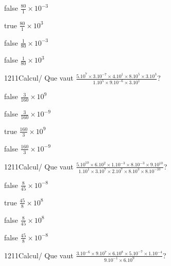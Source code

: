 \documentclass[11pt]{article}
\begin{document}
            \begin{reponses}
                \item[false] $\frac{80}{1}\times 10^{-3}$
                \item[true] $\frac{80}{1}\times 10^{3}$
                \item[false] $\frac{1}{80}\times 10^{-3}$
                \item[false] $\frac{1}{80}\times 10^{3}$
            \end{reponses}
            
            \begin{question}{1211}{Calcul}{}{/}
                Que vaut $\frac{5.10^{7}\times 3.10^{-7}\times 4.10^{1}\times 8.10^{5}\times 3.10^{3}}{1.10^{5}\times 9.10^{-6}\times 3.10^{1}}$?
            \end{question}
            
            \begin{reponses}
                \item[false] $\frac{3}{160}\times 10^{9}$
                \item[false] $\frac{3}{160}\times 10^{-9}$
                \item[true] $\frac{160}{3}\times 10^{9}$
                \item[false] $\frac{160}{3}\times 10^{-9}$
            \end{reponses}
            
            \begin{question}{1211}{Calcul}{}{/}
                Que vaut $\frac{5.10^{10}\times 6.10^{2}\times 1.10^{-3}\times 8.10^{-3}\times 9.10^{10}}{1.10^{1}\times 3.10^{7}\times 2.10^{7}\times 8.10^{3}\times 8.10^{-10}}$?
            \end{question}
            
            \begin{reponses}
                \item[false] $\frac{8}{45}\times 10^{-8}$
                \item[true] $\frac{45}{8}\times 10^{8}$
                \item[false] $\frac{8}{45}\times 10^{8}$
                \item[false] $\frac{45}{8}\times 10^{-8}$
            \end{reponses}
            
            \begin{question}{1211}{Calcul}{}{/}
                Que vaut $\frac{3.10^{-6}\times 9.10^{7}\times 6.10^{8}\times 5.10^{-7}\times 1.10^{-4}}{9.10^{-1}\times 6.10^{9}}$?
            \end{question}
            
\end{document}
